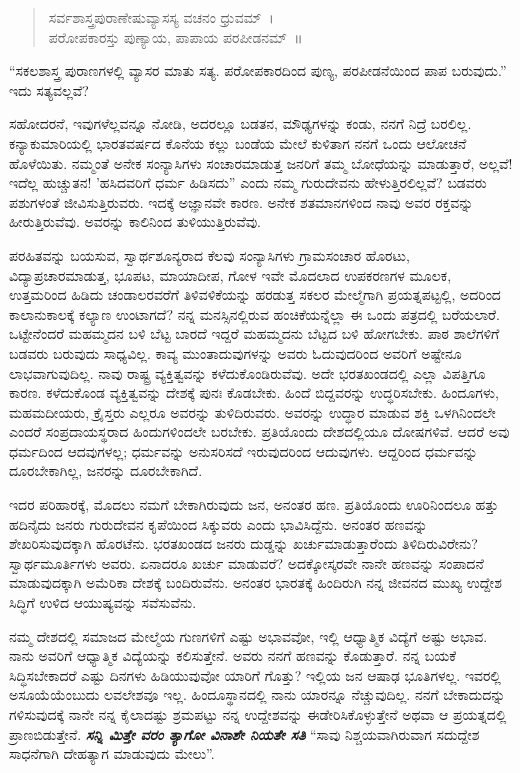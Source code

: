 \begin{verse}
 ಸರ್ವಶಾಸ್ತ್ರಪುರಾಣೇಷುವ್ಯಾಸಸ್ಯ ವಚನಂ ಧ್ರುವಮ್~।\\
 ಪರೋಪಕಾರಸ್ತು ಪುಣ್ಯಾಯ, ಪಾಪಾಯ ಪರಪೀಡನಮ್~॥ 
\end{verse}

“ಸಕಲಶಾಸ್ತ್ರ ಪುರಾಣಗಳಲ್ಲಿ ವ್ಯಾಸರ ಮಾತು ಸತ್ಯ. ಪರೋಪಕಾರದಿಂದ ಪುಣ್ಯ, ಪರಪೀಡನೆಯಿಂದ ಪಾಪ ಬರುವುದು.” ಇದು ಸತ್ಯವಲ್ಲವೆ?

ಸಹೋದರನೆ, ಇವುಗಳೆಲ್ಲವನ್ನೂ ನೋಡಿ, ಅದರಲ್ಲೂ ಬಡತನ, ಮೌಢ್ಯಗಳನ್ನು ಕಂಡು, ನನಗೆ ನಿದ್ರೆ ಬರಲಿಲ್ಲ. ಕನ್ಯಾಕುಮಾರಿಯಲ್ಲಿ ಭಾರತವರ್ಷದ ಕೊನೆಯ ಕಲ್ಲು ಬಂಡೆಯ ಮೇಲೆ ಕುಳಿತಾಗ ನನಗೆ ಒಂದು ಆಲೋಚನೆ ಹೊಳೆಯಿತು. ನಮ್ಮಂತೆ ಅನೇಕ ಸಂನ್ಯಾಸಿಗಳು ಸಂಚಾರಮಾಡುತ್ತ ಜನರಿಗೆ ತಮ್ಮ ಬೋಧೆಯನ್ನು ಮಾಡುತ್ತಾರೆ, ಅಲ್ಲವೆ! ಇದೆಲ್ಲ ಹುಚ್ಚುತನ! ’ಹಸಿದವರಿಗೆ ಧರ್ಮ ಹಿಡಿಸದು” ಎಂದು ನಮ್ಮ ಗುರುದೇವನು ಹೇಳುತ್ತಿರಲಿಲ್ಲವೆ? ಬಡವರು ಪಶುಗಳಂತೆ ಜೀವಿಸುತ್ತಿರುವರು. ಇದಕ್ಕೆ ಅಜ್ಞಾನವೇ ಕಾರಣ. ಅನೇಕ ಶತಮಾನಗಳಿಂದ ನಾವು ಅವರ ರಕ್ತವನ್ನು ಹೀರುತ್ತಿರುವೆವು. ಅವರನ್ನು ಕಾಲಿನಿಂದ ತುಳಿಯುತ್ತಿರುವೆವು.

ಪರಹಿತವನ್ನು ಬಯಸುವ, ಸ್ವಾರ್ಥಶೂನ್ಯರಾದ ಕೆಲವು ಸಂನ್ಯಾಸಿಗಳು ಗ್ರಾಮಸಂಚಾರ ಹೊರಟು, ವಿದ್ಯಾಪ್ರಚಾರಮಾಡುತ್ತ, ಭೂಪಟ, ಮಾಯಾದೀಪ, ಗೋಳ ಇವೇ ಮೊದಲಾದ ಉಪಕರಣಗಳ ಮೂಲಕ, ಉತ್ತಮರಿಂದ ಹಿಡಿದು ಚಂಡಾಲರವರೆಗೆ ತಿಳಿವಳಿಕೆಯನ್ನು ಹರಡುತ್ತ ಸಕಲರ ಮೇಲ್ಮೆಗಾಗಿ ಪ್ರಯತ್ನಪಟ್ಟಲ್ಲಿ, ಅದರಿಂದ ಕಾಲಾನುಕಾಲಕ್ಕೆ ಕಲ್ಯಾಣ ಉಂಟಾಗದೆ? ನನ್ನ ಮನಸ್ಸಿನಲ್ಲಿರುವ ಹಂಚಿಕೆಯನ್ನೆಲ್ಲಾ ಈ ಒಂದು ಪತ್ರದಲ್ಲಿ ಬರೆಯಲಾರೆ. ಒಟ್ಟೇನೆಂದರೆ ಮಹಮ್ಮದನ ಬಳಿ ಬೆಟ್ಟ ಬಾರದೆ ಇದ್ದರೆ ಮಹಮ್ಮದನು ಬೆಟ್ಟದ ಬಳಿ ಹೋಗಬೇಕು. ಪಾಠ ಶಾಲೆಗಳಿಗೆ ಬಡವರು ಬರುವುದು ಸಾಧ್ಯವಿಲ್ಲ. ಕಾವ್ಯ ಮುಂತಾದುವುಗಳನ್ನು ಅವರು ಓದುವುದರಿಂದ ಅವರಿಗೆ ಅಷ್ಟೇನೂ ಲಾಭವಾಗುವುದಿಲ್ಲ. ನಾವು ರಾಷ್ಟ್ರ ವ್ಯಕ್ತಿತ್ವವನ್ನು ಕಳೆದುಕೊಂಡಿರುವೆವು. ಅದೇ ಭರತಖಂಡದಲ್ಲಿ ಎಲ್ಲಾ ವಿಪತ್ತಿಗೂ ಕಾರಣ. ಕಳೆದುಕೊಂಡ ವ್ಯಕ್ತಿತ್ವವನ್ನು ದೇಶಕ್ಕೆ ಪುನಃ ಕೊಡಬೇಕು. ಹಿಂದೆ ಬಿದ್ದವರನ್ನು ಉದ್ಧರಿಸಬೇಕು. ಹಿಂದೂಗಳು, ಮಹಮದೀಯರು, ಕ್ರೈಸ್ತರು ಎಲ್ಲರೂ ಅವರನ್ನು ತುಳಿದಿರುವರು. ಅವರನ್ನು ಉದ್ಧಾರ ಮಾಡುವ ಶಕ್ತಿ ಒಳಗಿನಿಂದಲೇ ಎಂದರೆ ಸಂಪ್ರದಾಯಸ್ಥರಾದ ಹಿಂದುಗಳಿಂದಲೇ ಬರಬೇಕು. ಪ್ರತಿಯೊಂದು ದೇಶದಲ್ಲಿಯೂ ದೋಷಗಳಿವೆ. ಆದರೆ ಅವು ಧರ್ಮದಿಂದ ಆದವುಗಳಲ್ಲ; ಧರ್ಮವನ್ನು ಅನುಸರಿಸದೆ ಇರುವುದರಿಂದ ಆದುವುಗಳು. ಆದ್ದರಿಂದ ಧರ್ಮವನ್ನು ದೂರಬೇಕಾಗಿಲ್ಲ, ಜನರನ್ನು ದೂರಬೇಕಾಗಿದೆ.

ಇದರ ಪರಿಹಾರಕ್ಕೆ, ಮೊದಲು ನಮಗೆ ಬೇಕಾಗಿರುವುದು ಜನ, ಅನಂತರ ಹಣ. ಪ್ರತಿಯೊಂದು ಊರಿನಿಂದಲೂ ಹತ್ತು ಹದಿನೈದು ಜನರು ಗುರುದೇವನ ಕೃಪೆಯಿಂದ ಸಿಕ್ಕುವರು ಎಂದು ಭಾವಿಸಿದ್ದೆನು. ಅನಂತರ ಹಣವನ್ನು ಶೇಖರಿಸುವುದಕ್ಕಾಗಿ ಹೊರಟೆನು. ಭರತಖಂಡದ ಜನರು ದುಡ್ಡನ್ನು ಖರ್ಚುಮಾಡುತ್ತಾರೆಂದು ತಿಳಿದಿರುವಿರೇನು? ಸ್ವಾರ್ಥಮೂರ್ತಿಗಳು ಅವರು. ಏನಾದರೂ ಖರ್ಚು ಮಾಡುವರೆ? ಅದಕ್ಕೋಸ್ಕರವೇ ನಾನೇ ಹಣವನ್ನು ಸಂಪಾದನೆ ಮಾಡುವುದಕ್ಕಾಗಿ ಅಮೆರಿಕಾ ದೇಶಕ್ಕೆ ಬಂದಿರುವೆನು. ಅನಂತರ ಭಾರತಕ್ಕೆ ಹಿಂದಿರುಗಿ ನನ್ನ ಜೀವನದ ಮುಖ್ಯ ಉದ್ದೇಶ ಸಿದ್ಧಿಗೆ ಉಳಿದ ಆಯುಷ್ಯವನ್ನು ಸವೆಸುವೆನು.

\vspace{0.3cm}

ನಮ್ಮ ದೇಶದಲ್ಲಿ ಸಮಾಜದ ಮೇಲ್ಮೆಯ ಗುಣಗಳಿಗೆ ಎಷ್ಟು ಅಭಾವವೋ, ಇಲ್ಲಿ ಆಧ್ಯಾತ್ಮಿಕ ವಿದ್ಯೆಗೆ ಅಷ್ಟು ಅಭಾವ. ನಾನು ಅವರಿಗೆ ಆಧ್ಯಾತ್ಮಿಕ ವಿದ್ಯೆಯನ್ನು ಕಲಿಸುತ್ತೇನೆ. ಅವರು ನನಗೆ ಹಣವನ್ನು ಕೊಡುತ್ತಾರೆ. ನನ್ನ ಬಯಕೆ ಸಿದ್ಧಿಸಬೇಕಾದರೆ ಎಷ್ಟು ದಿನಗಳು ಹಿಡಿಯುವುವೋ ಯಾರಿಗೆ ಗೊತ್ತು? ಇಲ್ಲಿಯ ಜನ ಆಷಾಢ ಭೂತಿಗಳಲ್ಲ. ಇವರಲ್ಲಿ ಅಸೂಯೆಯೆಂಬುದು ಲವಲೇಶವೂ ಇಲ್ಲ. ಹಿಂದೂಸ್ಥಾನದಲ್ಲಿ ನಾನು ಯಾರನ್ನೂ ನೆಚ್ಚುವುದಿಲ್ಲ. ನನಗೆ ಬೇಕಾದುದನ್ನು ಗಳಿಸುವುದಕ್ಕೆ ನಾನೇ ನನ್ನ ಕೈಲಾದಷ್ಟು ಶ್ರಮಪಟ್ಟು ನನ್ನ ಉದ್ದೇಶವನ್ನು ಈಡೇರಿಸಿಕೊಳ್ಳುತ್ತೇನೆ ಅಥವಾ ಆ ಪ್ರಯತ್ನದಲ್ಲಿ ಪ್ರಾಣಬಿಡುತ್ತೇನೆ. \textbf{\textit{ಸನ್ನಿ ಮಿತ್ತೇ ವರಂ ತ್ಯಾಗೋ ವಿನಾಶೇ ನಿಯತೇ ಸತಿ}} \enginline{-} “ಸಾವು ನಿಶ್ಚಯವಾಗಿರುವಾಗ ಸದುದ್ದೇಶ ಸಾಧನೆಗಾಗಿ ದೇಹತ್ಯಾಗ ಮಾಡುವುದು ಮೇಲು”.


